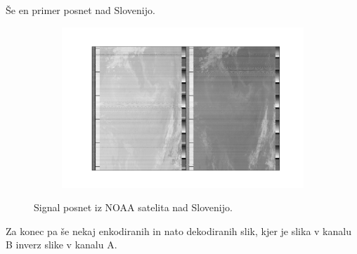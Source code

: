 \documentclass{article}
\begin{document}
Še en primer posnet nad Slovenijo.
\begin{figure}[H]
    \centering
    \begin{subfigure}[b]{0.8\textwidth}
        \centering
        \includegraphics[width=\textwidth]{slovenia.pdf}
    \end{subfigure}
	\caption{Signal posnet iz NOAA satelita nad Slovenijo.}
    \label{fig:out_example0}
\end{figure}
\newpage
Za konec pa še nekaj enkodiranih in nato dekodiranih slik, kjer je slika v kanalu B inverz slike v kanalu A. 
\end{document}
